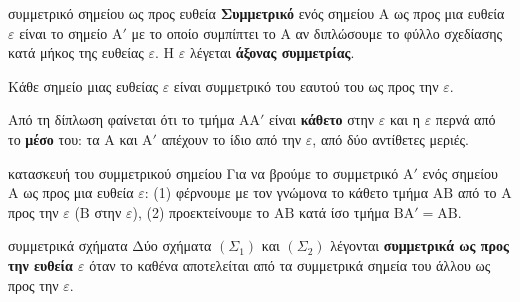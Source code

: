 

\begin{orismos}{συμμετρικό σημείου ως προς ευθεία}
\textbf{Συμμετρικό} ενός σημείου $\mathrm{Α}$ ως προς μια ευθεία $\varepsilon$ είναι το σημείο $\mathrm{Α}'$ με το οποίο συμπίπτει το $\mathrm{Α}$ αν διπλώσουμε το φύλλο σχεδίασης κατά μήκος της ευθείας $\varepsilon$. Η $\varepsilon$ λέγεται \textbf{άξονας συμμετρίας}.
\end{orismos}

Κάθε σημείο μιας ευθείας $\varepsilon$ είναι συμμετρικό του εαυτού του ως προς την $\varepsilon$.

Από τη δίπλωση φαίνεται ότι το τμήμα $\mathrm{ΑΑ}'$ είναι \textbf{κάθετο} στην $\varepsilon$ και η $\varepsilon$ περνά από το \textbf{μέσο} του: τα $\mathrm{Α}$ και $\mathrm{Α}'$ απέχουν το ίδιο από την $\varepsilon$, από δύο αντίθετες μεριές.

\begin{kanonas}{κατασκευή του συμμετρικού σημείου}
Για να βρούμε το συμμετρικό $\mathrm{Α}'$ ενός σημείου $\mathrm{Α}$ ως προς μια ευθεία $\varepsilon$: (1) φέρνουμε με τον γνώμονα το κάθετο τμήμα $\mathrm{ΑΒ}$ από το $\mathrm{Α}$ προς την $\varepsilon$ ($\mathrm{Β}$ στην $\varepsilon$), (2) προεκτείνουμε το $\mathrm{ΑΒ}$ κατά ίσο τμήμα $\mathrm{ΒΑ}'=\mathrm{ΑΒ}$.
\end{kanonas}

\begin{center}
\end{center}


\begin{kanonas}{συμμετρικά σχήματα}
Δύο σχήματα $(\Sigma_1)$ και $(\Sigma_2)$ λέγονται \textbf{συμμετρικά ως προς την ευθεία $\varepsilon$} όταν το καθένα αποτελείται από τα συμμετρικά σημεία του άλλου ως προς την $\varepsilon$.
\end{kanonas}

